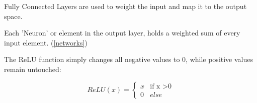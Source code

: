 Fully Connected Layers are used to weight the input  and map it to the output space. 

Each 'Neuron' or element in the output layer, holds a weighted sum of every input element. (\ref{networks})

The ReLU function simply changes all negative values to 0, while positive values remain untouched:

\begin{equation}
ReLU (x) = 
\begin{cases}
x & \text{if x >0} \\
0 & else
\end{cases}
\end{equation}


\pagebreak